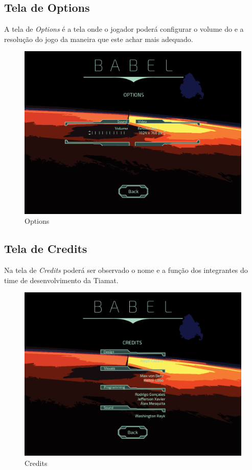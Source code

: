 \documentclass[11pt]{article} %
\begin{document}
\subsection{Tela de Options}

A tela de \textit{Options} é a tela onde o jogador poderá configurar o volume do e a resolução do jogo da maneira que este achar mais adequado.

\begin{figure}[!htp]
\centering
\includegraphics[scale=0.25]{res/options.png}
\caption{Options}
\label{Options}
\end{figure}

\subsection{Tela de Credits}

Na tela de \textit{Credits} poderá ser observado o nome e a função dos integrantes do time de desenvolvimento da Tiamat.

\begin{figure}[!htp]
\centering
\includegraphics[scale=0.25]{res/credits.png}
\caption{Credits}
\label{Credits}
\end{figure}
\end{document}
